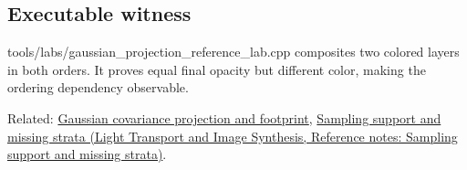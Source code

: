 \subsection{Executable witness}\label{appendix-5f4b2e24c3f6-executable-witness}

tools/labs/gaussian\_projection\_reference\_lab.cpp composites two colored layers in both orders. It proves equal final opacity but different color, making the ordering dependency observable.

Related: \hyperref[appendix-24269cb6977c]{Gaussian covariance projection and footprint}, \href{../04-Light-Transport-and-Image-Synthesis/main.pdf\#nameddest=appendix-10308c3d753e}{Sampling support and missing strata (Light Transport and Image Synthesis, Reference notes: Sampling support and missing strata)}.
